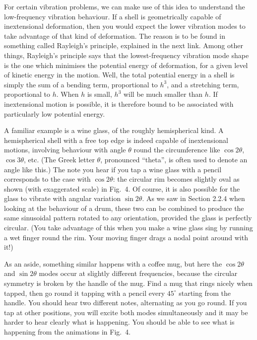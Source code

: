   For certain vibration problems, we can make use of this idea to understand 
  the low-frequency vibration behaviour. If a shell is geometrically capable of 
  inextensional deformation, then you would expect the lower vibration modes to 
  take advantage of that kind of deformation. The reason is to be found in 
  something called Rayleigh's principle, explained in the next link. Among 
  other things, Rayleigh's principle says that the lowest-frequency vibration 
  mode shape is the one which minimises the potential energy of deformation, 
  for a given level of kinetic energy in the motion. Well, the total potential 
  energy in a shell is simply the sum of a bending term, proportional to $h^3$, 
  and a stretching term, proportional to $h$. When $h$ is small, $h^3$ will be 
  much smaller than $h$. If inextensional motion is possible, it is therefore 
  bound to be associated with particularly low potential energy. 

  A familiar example is a wine glass, of the roughly hemispherical kind. A 
  hemispherical shell with a free top edge is indeed capable of inextensional 
  motions, involving behaviour with angle $\theta$ round the circumference like 
  $\cos 2 \theta$, $\cos 3 \theta$, etc. (The Greek letter $\theta$, pronounced 
  ``theta'', is often used to denote an angle like this.) The note you hear if 
  you tap a wine glass with a pencil corresponds to the case with $\cos 2 
  \theta$: the circular rim becomes slightly oval as shown (with exaggerated 
  scale) in Fig.\ 4. Of course, it is also possible for the glass to vibrate 
  with angular variation $\sin 2 \theta$. As we saw in Section 2.2.4 when 
  looking at the behaviour of a drum, these two can be combined to produce the 
  same sinusoidal pattern rotated to any orientation, provided the glass is 
  perfectly circular. (You take advantage of this when you make a wine glass 
  sing by running a wet finger round the rim. Your moving finger drags a nodal 
  point around with it!) 

  As an aside, something similar happens with a coffee mug, but here the $\cos 
  2 \theta$ and $\sin 2 \theta$ modes occur at slightly different frequencies, 
  because the circular symmetry is broken by the handle of the mug. Find a mug 
  that rings nicely when tapped, then go round it tapping with a pencil every 
  $45^\circ$ starting from the handle. You should hear two different notes, 
  alternating as you go round. If you tap at other positions, you will excite 
  both modes simultaneously and it may be harder to hear clearly what is 
  happening. You should be able to see what is happening from the animations in 
  Fig.\ 4. 

